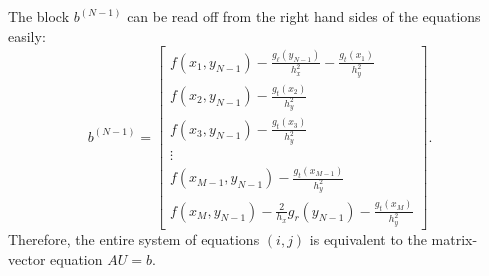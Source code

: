 \documentclass{homework}
\begin{document}
\begin{alphaparts}
\begin{equation*}
		\end{equation*}
		The block $b^{(N-1)}$ can be read off from the right hand sides of the equations easily:
		\begin{equation*}
			b^{(N-1)} = \left[\begin{matrix}
				f(x_1,y_{N-1}) - \frac{g_\ell(y_{N-1})}{h_x^2} - \frac{g_t(x_1)}{h_y^2} \\
				f(x_2,y_{N-1}) - \frac{g_t(x_2)}{h_y^2} \\
				f(x_3,y_{N-1}) - \frac{g_t(x_3)}{h_y^2} \\
				\vdots \\
				f(x_{M-1},y_{N-1}) - \frac{g_t(x_{M-1})}{h_y^2}\\
				f(x_{M},y_{N-1}) - \frac{2}{h_x}g_r(y_{N-1}) - \frac{g_t(x_{M})}{h_y^2}
			\end{matrix}\right].
		\end{equation*}
		Therefore, the entire system of equations $(i,j)$ is equivalent to the matrix-vector equation $AU = b$.
		
	\end{alphaparts}
		
\end{document}
